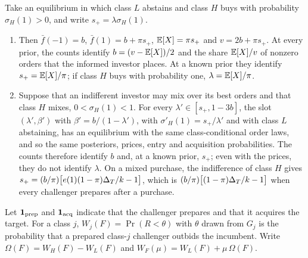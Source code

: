 \begin{corollary}\label{cor:purchasesonly}
Take an equilibrium in which class \(L\) abstains and class \(H\) buys with probability \(\sigma_H(1)>0\), and write
\(s_+=\lambda\sigma_H(1)\).
\begin{enumerate}[label=(\alph*),leftmargin=2em]
\item Then \(\bar f(-1)=b\), \(\bar f(1)=b+\pi s_+\), \(\mathbb{E}[X]=\pi s_+\) and \(v=2b+\pi s_+\). At every prior, the
counts identify \(b=(v-\mathbb{E}[X])/2\) and the share \(\mathbb{E}[X]/v\) of nonzero orders that the informed investor places. At
a known prior they identify \(s_+=\mathbb{E}[X]/\pi\); if class \(H\) buys with probability one, \(\lambda=\mathbb{E}[X]/\pi\).
\item Suppose that an indifferent investor may mix over its best orders and that class \(H\) mixes,
\(0<\sigma_H(1)<1\). For every \(\lambda'\in[s_+,1-3b]\), the slot \((\lambda',\beta')\) with \(\beta'=b/(1-\lambda')\), with
\(\sigma'_H(1)=s_+/\lambda'\) and with class \(L\) abstaining, has an equilibrium with the same class-conditional
order laws, and so the same posteriors, prices, entry and acquisition probabilities. The counts
therefore identify \(b\) and, at a known prior, \(s_+\); even with the prices, they do not identify \(\lambda\). On a mixed purchase, the indifference of
class \(H\) gives \(s_+=(b/\pi)\bigl[e(1)(1-\pi)\Delta_T/k-1\bigr]\), which is \((b/\pi)\bigl[(1-\pi)\Delta_T/k-1\bigr]\) when
every challenger prepares after a purchase.
\end{enumerate}
\end{corollary}

Let \(\mathbf{1}_{\rm prep}\) and \(\mathbf{1}_{\rm acq}\) indicate that the challenger prepares and that it acquires the target. For
a class \(j\), \(W_j(F)=\Pr(R<\theta)\) with \(\theta\) drawn from \(G_j\) is the probability that a prepared
class-\(j\) challenger outbids the incumbent. Write \(\Omega(F)=W_H(F)-W_L(F)\) and \(W_F(\mu)=W_L(F)+\mu\,\Omega(F)\).

